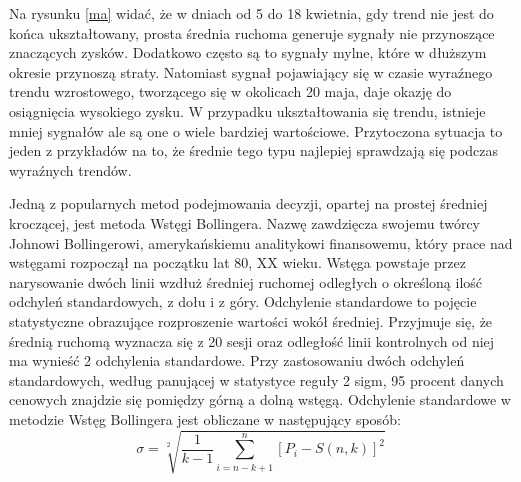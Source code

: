 \documentclass[pdflatex,11pt]{aghdpl}
\begin{document}
Na rysunku \ref{ma} widać, że w dniach od 5 do 18 kwietnia, gdy trend nie jest do końca ukształtowany, prosta średnia ruchoma generuje sygnały nie przynoszące znaczących zysków. Dodatkowo często są to sygnały mylne, które w dłuższym okresie przynoszą straty. Natomiast sygnał pojawiający się w czasie wyraźnego trendu wzrostowego, tworzącego się w okolicach 20 maja, daje okazję do osiągnięcia wysokiego zysku. W przypadku ukształtowania się trendu, istnieje mniej sygnałów ale są one o wiele bardziej wartościowe. Przytoczona sytuacja to jeden z przykładów na to, że średnie tego typu najlepiej sprawdzają się podczas wyraźnych trendów.

Jedną z popularnych metod podejmowania decyzji, opartej na prostej średniej kroczącej, jest metoda Wstęgi Bollingera. Nazwę zawdzięcza swojemu twórcy Johnowi Bollingerowi, amerykańskiemu analitykowi finansowemu, który prace nad wstęgami rozpoczął na początku lat 80, XX wieku. Wstęga powstaje przez narysowanie dwóch linii wzdłuż średniej ruchomej odległych o określoną ilość odchyleń standardowych, z dołu i z góry. Odchylenie standardowe to pojęcie statystyczne obrazujące rozproszenie wartości wokół średniej. Przyjmuje się, że średnią ruchomą wyznacza się z 20 sesji oraz odległość linii kontrolnych od niej ma wynieść 2 odchylenia standardowe. Przy zastosowaniu dwóch odchyleń standardowych, według panującej w statystyce reguły 2 sigm, 95 procent danych cenowych znajdzie się pomiędzy górną a dolną wstęgą\cite{5}. Odchylenie standardowe w metodzie Wstęg Bollingera jest obliczane w następujący sposób:
\begin{equation}
\sigma = \sqrt[2 ]{\frac{1}{k-1} \sum_{i=n-k+1}^{n}{[{P_{i}-S(n,k)}]}^{2} } 
\label{eqn:wzor}
\end{equation}
\end{document}
